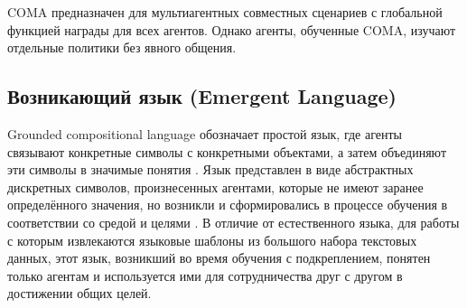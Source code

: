 COMA предназначен для мультиагентных совместных сценариев с глобальной функцией награды для всех агентов. Однако агенты, обученные COMA, изучают отдельные политики без явного общения. \cite{foerster2017counterfactual}

\subsection{Возникающий язык (Emergent Language)}

Grounded compositional language обозначает простой язык, где агенты связывают конкретные символы с конкретными объектами, а затем объединяют эти символы в значимые понятия \cite{Szabo2008-SZAC}. Язык представлен в виде абстрактных дискретных символов, произнесенных агентами, которые не имеют заранее определённого значения, но возникли и сформировались в процессе обучения в соответствии со средой и целями \cite{mordatch2017emergence}. В отличие от естественного языка, для работы с которым извлекаются языковые шаблоны из большого набора текстовых данных, этот язык, возникший во время обучения с подкреплением, понятен только агентам и используется ими для сотрудничества друг с другом в достижении общих целей.
